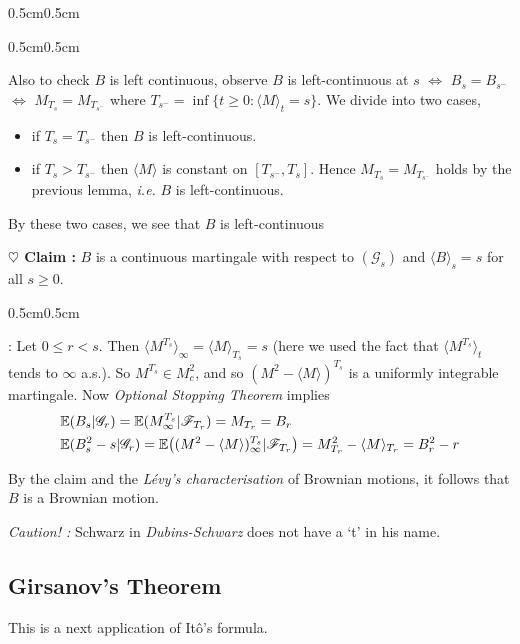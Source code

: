\documentclass[10pt,a4paper]{article}
\newenvironment{proof}
{\begin{changemargin}{0.5cm}{0.5cm} 
	}%
	{\end{changemargin}
}
\newenvironment{subproof}
{\begin{changemargin}{0.5cm}{0.5cm} 
	}%
	{\end{changemargin}
}
\renewenvironment{i}
{\begin{itemize} 
	}%
	{\end{itemize}
}
\newenvironment{p}
{\begin{proof} 
	}%
	{\end{proof}
}
\begin{document}
\begin{p}
\begin{subproof}
Also to check $B$ is left continuous, observe $B$ is left-continuous at $s$ $\Leftrightarrow$ $B_s = B_{s^-}$ $\Leftrightarrow$ $M_{T_s} = M_{T_{s^-}}$ where $T_{s^-} = \inf \{t\geq 0 : \langle M \rangle_t =s \}$. We divide into two cases,
\begin{i}
\item if $T_s = T_{s^-}$ then $B$ is left-continuous.
\item if $T_s > T_{s^-}$ then $\langle M \rangle$ is constant on $[T_{s^-}, T_s]$. Hence $M_{T_s} = M_{T_{s^-}}$ holds by the previous lemma, \textit{i.e.} $B$ is left-continuous.
\end{i}
By these two cases, we see that $B$ is left-continuous
\end{subproof}
\textbf{$\heartsuit$ Claim :} $B$ is a continuous martingale with respect to $(\mathscr{G}_s)$ and $\langle B \rangle_s = s$ for all $s\geq 0$.
\begin{subproof}
: Let $0\leq r <s$. Then $\langle M^{T_s} \rangle_{\infty} = \langle M \rangle_{T_s} = s$ (here we used the fact that $\langle M^{T_s} \rangle_t$ tends to $\infty$ a.s.). So $M^{T_s} \in M_c^2$, and so $(M^2 - \langle M \rangle)^{T_s}$ is a uniformly integrable martingale. Now \emph{Optional Stopping Theorem} implies
\begin{align*}
& \mathbb{E} (B_s | \mathscr{G}_r) = \mathbb{E} (M_{\infty}^{T_s} | \mathscr{F}_{T_r} ) = M_{T_r} = B_r \\
& \mathbb{E} (B_s^2 - s | \mathscr{G}_r) = \mathbb{E} \big( (M^2 - \langle M \rangle)^{T_s}_{\infty} | \mathscr{F}_{T_r}\big) = M^2_{T_r} - \langle M \rangle_{T_r} = B_r^2 -r 
\end{align*}
\end{subproof}
By the claim and the \emph{L\'evy's characterisation} of Brownian motions, it follows that $B$ is a Brownian motion.

\eop
\end{p}
\s

\emph{Caution! :} Schwarz in \emph{Dubins-Schwarz} does not have a `t' in his name.

\subsection{Girsanov's Theorem}

This is a next application of It\^o's formula.
\s
\end{document}

